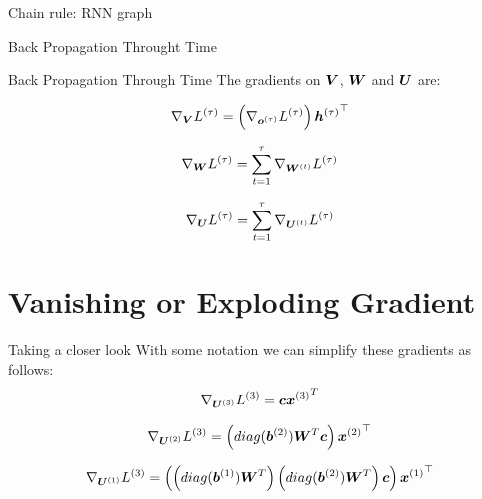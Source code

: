 \documentclass[10pt]{beamer}
\begin{document}
\begin{frame}{Chain rule: RNN graph}

\end{frame}

\begin{frame}{Back Propagation Throught Time}

\end{frame}

\begin{frame}{Back Propagation Through Time}
The gradients on $\bm{V}$, $\bm{W}$ and $\bm{U}$ are:
\vspace{0.3cm}
\Large{
\begin{equation*}
\nabla_{\bm{V}} {L^{(\tau)}} = \left({\nabla_{\bm{o}^{(\tau)}} {L^{(\tau)}}}\right){\bm{h}^{(\tau)}}^{\top} 
\end{equation*}


\begin{equation*}
\nabla_{\bm{W}} {L^{(\tau)}} = \sum_{t=1}^{\tau}\nabla_{\bm{W}^{(t)}} {L^{(\tau)}}
\end{equation*}

\begin{equation*}
\nabla_{\bm{U}} {L^{(\tau)}} = \sum_{t=1}^{\tau}\nabla_{\bm{U}^{(t)}} {L^{(\tau)}}
\end{equation*}
}
\end{frame}

\section{Vanishing or Exploding Gradient}


\begin{frame}{Taking a closer look}
With some notation we can simplify these gradients as follows:
\begin{eqnarray*}
\nabla_{\bm{U}^{(3)}} {L^{(3)}} = \bm{c}{\bm{x}^{(3)}}^{T}
\end{eqnarray*}

\begin{eqnarray*}
\nabla_{\bm{U}^{(2)}} {L^{(3)}} = \left({diag(\bm{b}^{(2)}) \bm{W}^{T} \bm{c}}\right){\bm{x}^{(2)}}^{\top}
\end{eqnarray*}

\begin{eqnarray*}
\nabla_{\bm{U}^{(1)}} {L^{(3)}} = \left({\left(diag(\bm{b}^{(1)}) \bm{W}^{T} \right) \left(diag(\bm{b}^{(2)}) \bm{W}^{T}\right) \bm{c}}\right){\bm{x}^{(1)}}^{\top}
\end{eqnarray*}

\end{frame}
\end{document}

